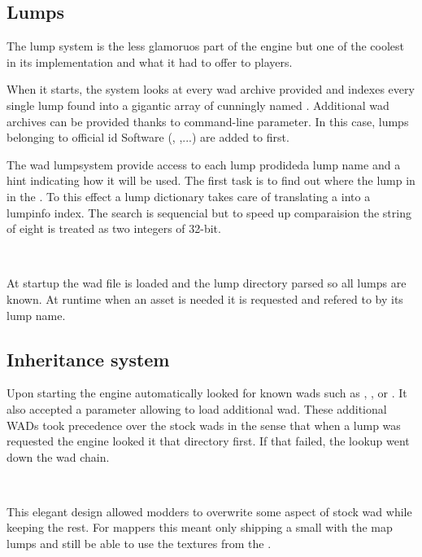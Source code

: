 \subsection{Lumps}
The lump system is the less glamoruos part of the engine but one of the coolest in its implementation and what it had to offer to players.\\
\par
When it starts, the system looks at every wad archive provided and indexes every single lump found into a gigantic array of  cunningly named . 
Additional wad archives can be provided thanks to  command-line parameter. In this case, lumps belonging to official id Software (, ,...) are added to  first.\\
\par
\vspace{4in}
\par
The wad lumpsystem provide access to each lump prodideda lump name and a hint indicating how it will be used. The first task is to find out where the lump in in the . To this effect a lump dictionary takes care of translating a  into a lumpinfo index. The search is sequencial but to speed up comparaision the string of eight is treated as two integers of 32-bit.\\
\par
{}\\
\par


At startup the wad file is loaded and the lump directory parsed so all lumps are known. At runtime when an asset is needed it is requested and refered to by its lump name.\\
\par
{}


\subsection{Inheritance system}
Upon starting the engine automatically looked for known wads such as , , or . It also accepted a parameter  allowing to load additional wad. These additional WADs took precedence over the stock wads in the sense that when a lump was requested the engine looked it that directory first. If that failed, the lookup went down the wad chain.\\
\par
{}\\
\par
 This elegant design allowed modders to overwrite some aspect of stock wad while keeping the rest. For mappers this meant only shipping a small  with the map lumps and still be able to use the textures from the .\\
 \par